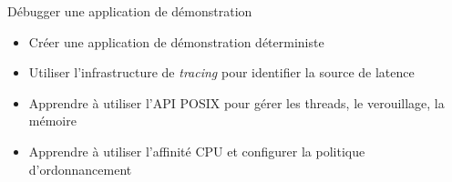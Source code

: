 {Débugger une application de démonstration}
{
  \begin{itemize}
  \item Créer une application de démonstration déterministe
  \item Utiliser l'infrastructure de {\em tracing} pour identifier la source de latence
  \item Apprendre à utiliser l'API POSIX pour gérer les threads, le verouillage, la mémoire
  \item Apprendre à utiliser l'affinité CPU et configurer la politique d'ordonnancement
  \end{itemize}
}

\def \feshowboards{
    \ifthenelse{\equal{\agendalanguage}{french}}{
      \section{Plateforme matérielle pour les travaux pratiques}
    }{
      \section{Hardware platform for practical labs}
    }

  \showboarditem{stm32mp1}
  \newpage
}

